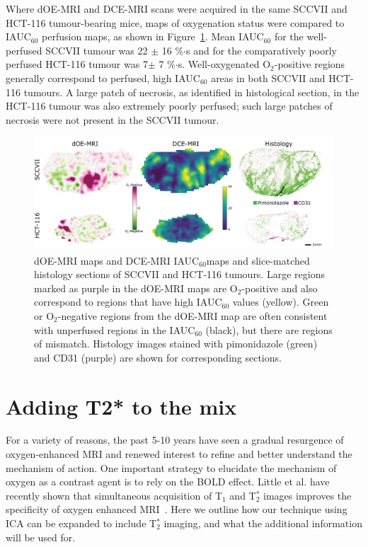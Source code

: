 Where \ac{dOE-MRI} and DCE-MRI scans were acquired in the same SCCVII and HCT-116 tumour-bearing mice,  maps of oxygenation status were compared to IAUC$_{60}$ perfusion maps, as shown in Figure~\ref{fig_perfusion}.
Mean IAUC$_{60}$ for the well-perfused SCCVII tumour was 22 $\pm$ 16 \%$\cdot$s and for the comparatively poorly perfused HCT-116 tumour was 7$\pm$ 7 \%$\cdot$s.
Well-oxygenated O$_2$-positive regions generally correspond to perfused, high IAUC$_{60}$ areas in both SCCVII and HCT-116 tumours.
A large patch of necrosis, as identified in histological section, in the HCT-116 tumour was also extremely poorly perfused; such large patches of necrosis were not present in the SCCVII tumour.

\begin{figure}[htbp]
   \centering
   \includegraphics[width=\textwidth]{futurework/futurework-images/fig_perfusion.png} %
   \caption{\ac{dOE-MRI} maps and DCE-MRI IAUC$_{60}$maps and slice-matched histology sections of SCCVII and HCT-116 tumours. Large regions marked as purple in the \ac{dOE-MRI} maps are O$_2$-positive and also correspond to regions that have high IAUC$_{60}$ values (yellow). Green or O$_2$-negative regions from the \ac{dOE-MRI} map are often consistent with unperfused regions in the IAUC$_{60}$ (black), but there are regions of mismatch. Histology images stained with pimonidazole (green) and CD31 (purple) are shown for corresponding sections.
   \label{fig_perfusion}}
\end{figure}

\section{Adding T2* to the mix}

For a variety of reasons, the past 5-10 years have seen a gradual resurgence of oxygen-enhanced MRI and renewed interest to refine and better understand the mechanism of action.
One important strategy to elucidate the mechanism of oxygen as a contrast agent is to rely on the \acs{BOLD} effect. 
Little et al. have recently shown that simultaneous acquisition of T$_1$ and T$_2^*$ images improves the specificity of oxygen enhanced MRI~\cite{Little:2018iu}.
Here we outline how our technique using \acs{ICA} can be expanded to include T$_2^*$ imaging, and what the additional information will be used for.

